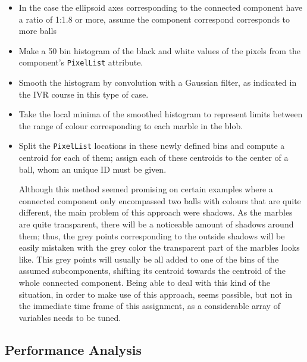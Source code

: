 \documentclass[10pt,a4paper,onecolumn]{report}
\begin{document}
\begin{itemize}
\item In the case the ellipsoid axes corresponding to the connected component have a ratio of 1:1.8 or more, assume the component correspond corresponds to more balls

\item Make a 50 bin histogram of the black and white values of the pixels from the component's \texttt{PixelList} attribute.

\item Smooth the histogram by convolution with a Gaussian filter, as indicated in the IVR course in this type of case.

\item Take the local minima of the smoothed histogram to represent limits between the range of colour corresponding to each marble in the blob.

\item Split the \texttt{PixelList} locations in these newly defined bins and compute a centroid for each of them; assign each of these centroids to the center of a ball, whom an unique ID must be given.

Although this method seemed promising on certain examples where a connected component only encompassed two balls with colours that are quite different, the main problem of this approach were shadows. As the marbles are quite transparent, there will be a noticeable amount of shadows around them; thus, the grey points corresponding to the outside shadows will be easily mistaken with the grey color the transparent part of the marbles looks like. This grey points will usually be all added to one of the bins of the assumed subcomponents, shifting its centroid towards the centroid of the whole connected component. Being able to deal with this kind of the situation, in order to make use of this approach, seems possible, but not in the immediate time frame of this assignment, as a considerable array of variables needs to be tuned.

\end{itemize}  

\subsection{Performance Analysis}
\end{document}

